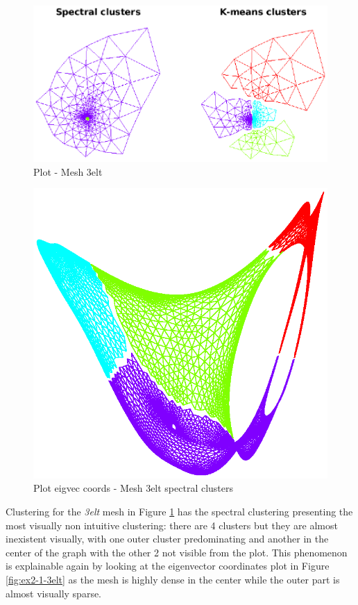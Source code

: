 \documentclass[unicode,11pt,a4paper,oneside,numbers=endperiod,openany]{scrartcl}
\begin{document}
\begin{figure}[H]
    \centering
    \caption{Plot - Mesh 3elt}
    \label{fig:ex2-2-3elt}
    \includegraphics[width=\textwidth, trim={0cm 4.5cm 0cm 0cm}, clip]{./img/ex2-2-3elt.eps}
\end{figure}

\begin{figure}[H]
    \centering
    \caption{Plot eigvec coords - Mesh 3elt spectral clusters}
    \label{fig:ex2-2-3elt-eigs}
    \includegraphics[width=\textwidth, trim={0cm 1cm 0cm 1cm}, clip]{./img/ex2-2-3elt-eigs.eps}
\end{figure}

Clustering for the \textit{3elt} mesh in Figure \ref{fig:ex2-2-3elt} has the spectral clustering
presenting the most visually non intuitive clustering: there are 4 clusters but they are almost inexistent
visually, with one outer cluster predominating and another in the center of the graph with the other 2
not visible from the plot.
This phenomenon is explainable again by looking at the eigenvector coordinates plot
in Figure \ref{fig:ex2-1-3elt} as the mesh is highly dense in the center while the outer part is
almost visually sparse.
\\
\end{document}
